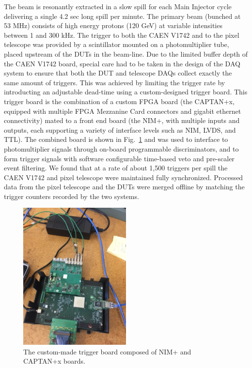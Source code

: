 \documentclass[preprint,1p]{elsarticle}
\begin{document}
The beam is resonantly extracted in a slow spill for each Main Injector cycle
delivering a single 4.2 sec long spill per minute. The primary beam (bunched at
53 MHz) consists of high energy protons (120 GeV) at variable intensities
between 1 and 300 kHz. The trigger to both the CAEN V1742 and to the pixel
telescope was provided by a scintillator mounted on a photomultiplier tube,
placed upstream of the DUTs in the beam-line. Due to the limited buffer depth of
the CAEN V1742 board, special care had to be taken in the design of the DAQ
system to ensure that both the DUT and telescope DAQs collect exactly the same
amount of triggers. This was achieved by limiting the trigger rate by
introducting an adjustable dead-time using a custom-designed trigger board. This
trigger board is the combination of a custom FPGA board (the CAPTAN+x, equipped
with multiple FPGA Mezzanine Card connectors and gigabit ethernet connectivity)
mated to a front end board (the NIM+, with multiple inputs and outputs, each
supporting a variety of interface levels such as NIM, LVDS, and TTL). The
combined board is shown in Fig.~\ref{fig:NIM+Captan} and was used to interface to
photomultiplier signals through on-board programmable discriminators, and to form
trigger signals with software configurable time-based veto and pre-scaler event
filtering. We found that at a rate of about 1,500 triggers per spill the CAEN
V1742 and pixel telescope were maintained fully synchronized. Processed data
from the pixel telescope and the DUTs were merged offline by matching the
trigger counters recorded by the two systems.

\begin{figure}[htbp] 
\centering
\includegraphics[width=0.5\textwidth, angle=270]{figs/CAPTAN_NIM_Plus.JPG} 
\caption{The custom-made trigger board composed of NIM+ and CAPTAN+x boards.} 
\label{fig:NIM+Captan} 
\end{figure} 
\end{document}
